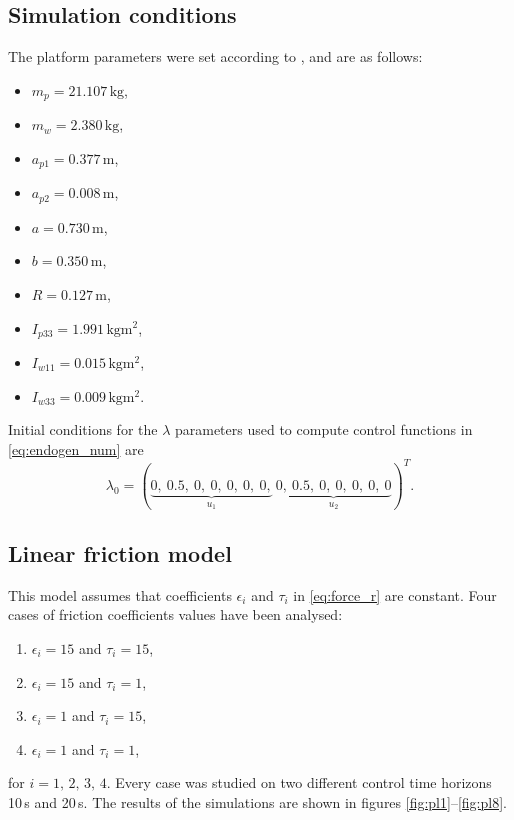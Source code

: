 \subsection{Simulation conditions}
\label{sec:pltf_params}
The platform parameters were set according to \cite{coupled}, and are as follows:
\begin{multicols}{2}
\begin{itemize}
\item $m_p = 21.107\,\mathrm{kg}$,
\item $m_w = 2.380\,\mathrm{kg}$,
\item $a_{p1} = 0.377\,\mathrm{m}$,
\item $a_{p2} = 0.008\,\mathrm{m}$,
\item $a = 0.730\,\mathrm{m}$,
\item $b = 0.350\,\mathrm{m}$,
\item $R = 0.127\,\mathrm{m}$,
\item $I_{p33} = 1.991\,\mathrm{kgm^2}$,
\item $I_{w11} = 0.015\,\mathrm{kgm^2}$,
\item $I_{w33} = 0.009\,\mathrm{kgm^2}$.
\end{itemize}
\end{multicols}
\hspace{-\parindent}Initial conditions for the $\lambda$ parameters used to compute control functions
in \eqref{eq:endogen_num} are
\begin{equation}
\lambda_0=
(\underbrace{0, \ 0.5, \ 0, \ 0, \ 0, \ 0, \ 0,}_{u_1}\ \underbrace{0, \ 0.5, \ 0, \ 0, \ 0, \ 0, \ 0}_{u_2})^T.
\end{equation}
 	

\subsection{Linear friction model}
This model assumes that coefficients $\epsilon_i$ and $\tau_i$ in \eqref{eq:force_r} are constant. Four cases of friction coefficients values have been analysed:
\begin{enumerate}
\item $\epsilon_i=15$ and $\tau_i=15$,
\item $\epsilon_i=15$ and $\tau_i=1$,
\item $\epsilon_i=1$ and $\tau_i=15$,
\item $\epsilon_i=1$ and $\tau_i=1$,
\end{enumerate}
for $i=1,\,2,\,3,\,4$.
Every case was studied on two different control time horizons 10\,s and 20\,s. The results of the
simulations are shown in figures \ref{fig:pl1}--\ref{fig:pl8}.


